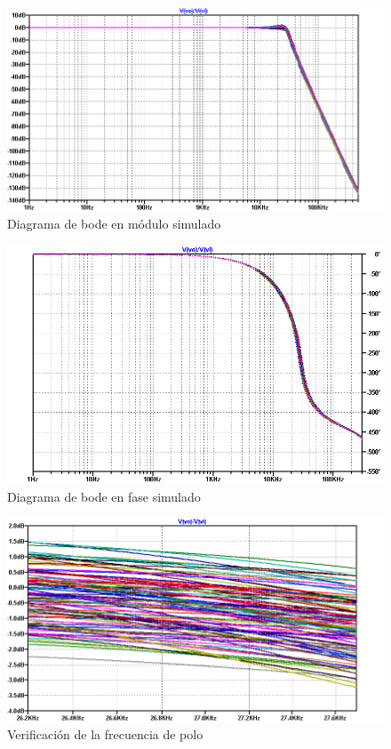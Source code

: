 \begin{figure}[H]
    \centering
    \includegraphics[scale=0.6]{../EJ1/Recursos/legendre_verificacion_magnitud.png}
    \caption{Diagrama de bode en m\'odulo simulado}
\end{figure}

\begin{figure}[H]
    \centering
    \includegraphics[scale=0.6]{../EJ1/Recursos/legendre_verificacion_fase.png}
    \caption{Diagrama de bode en fase simulado}
\end{figure}

\begin{figure}[H]
    \centering
    \includegraphics[scale=0.6]{../EJ1/Recursos/legendre_verificacion_fp.png}
    \caption{Verificaci\'on de la frecuencia de polo}
\end{figure}

